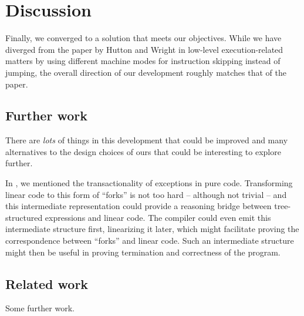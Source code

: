 \chapter{Discussion}

Finally, we converged to a solution that meets our objectives. While we have diverged from the
paper by Hutton and Wright \cite{gmh:exceptions} in low-level execution-related matters
by using different machine modes for instruction skipping instead of jumping, the overall
direction of our development roughly matches that of the paper.

\section{Further work}

There are \emph{lots} of things in this development that could be improved and many alternatives
to the design choices of ours that could be interesting to explore further.

In , we mentioned the transactionality of exceptions in pure code. Transforming
linear code to this form of ``forks'' is not too hard -- although not trivial -- and this
intermediate representation could provide a reasoning bridge between tree-structured expressions
and linear code. The compiler could even emit this intermediate structure first,
linearizing it later, which might facilitate proving the correspondence between ``forks''
and linear code. Such an intermediate structure might then be useful in proving termination and
correctness of the program.

\section{Related work}

Some further work.










